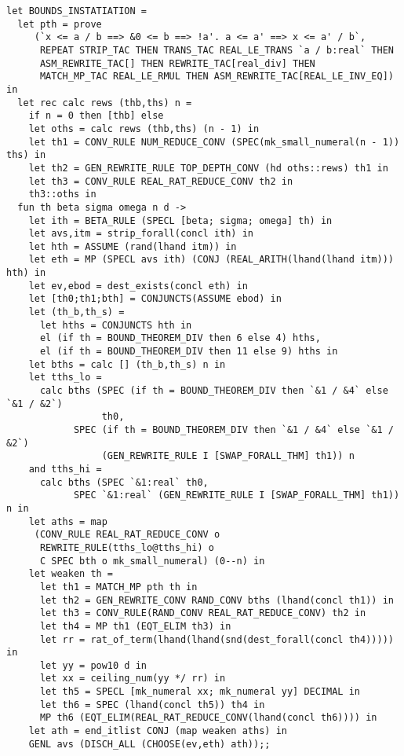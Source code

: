 \documentclass[10pt]{article}
\theoremstyle{definition}
\theoremstyle{remark}
\numberwithin{equation}{section}
\begin{document}
\begin{scriptsize}\begin{verbatim}
let BOUNDS_INSTATIATION =
  let pth = prove
     (`x <= a / b ==> &0 <= b ==> !a'. a <= a' ==> x <= a' / b`,
      REPEAT STRIP_TAC THEN TRANS_TAC REAL_LE_TRANS `a / b:real` THEN
      ASM_REWRITE_TAC[] THEN REWRITE_TAC[real_div] THEN
      MATCH_MP_TAC REAL_LE_RMUL THEN ASM_REWRITE_TAC[REAL_LE_INV_EQ]) in
  let rec calc rews (thb,ths) n =
    if n = 0 then [thb] else
    let oths = calc rews (thb,ths) (n - 1) in
    let th1 = CONV_RULE NUM_REDUCE_CONV (SPEC(mk_small_numeral(n - 1)) ths) in
    let th2 = GEN_REWRITE_RULE TOP_DEPTH_CONV (hd oths::rews) th1 in
    let th3 = CONV_RULE REAL_RAT_REDUCE_CONV th2 in
    th3::oths in
  fun th beta sigma omega n d ->
    let ith = BETA_RULE (SPECL [beta; sigma; omega] th) in
    let avs,itm = strip_forall(concl ith) in
    let hth = ASSUME (rand(lhand itm)) in
    let eth = MP (SPECL avs ith) (CONJ (REAL_ARITH(lhand(lhand itm))) hth) in
    let ev,ebod = dest_exists(concl eth) in
    let [th0;th1;bth] = CONJUNCTS(ASSUME ebod) in
    let (th_b,th_s) =
      let hths = CONJUNCTS hth in
      el (if th = BOUND_THEOREM_DIV then 6 else 4) hths,
      el (if th = BOUND_THEOREM_DIV then 11 else 9) hths in
    let bths = calc [] (th_b,th_s) n in
    let tths_lo =
      calc bths (SPEC (if th = BOUND_THEOREM_DIV then `&1 / &4` else `&1 / &2`)
                 th0,
            SPEC (if th = BOUND_THEOREM_DIV then `&1 / &4` else `&1 / &2`)
                 (GEN_REWRITE_RULE I [SWAP_FORALL_THM] th1)) n
    and tths_hi =
      calc bths (SPEC `&1:real` th0,
            SPEC `&1:real` (GEN_REWRITE_RULE I [SWAP_FORALL_THM] th1)) n in
    let aths = map
     (CONV_RULE REAL_RAT_REDUCE_CONV o
      REWRITE_RULE(tths_lo@tths_hi) o
      C SPEC bth o mk_small_numeral) (0--n) in
    let weaken th =
      let th1 = MATCH_MP pth th in
      let th2 = GEN_REWRITE_CONV RAND_CONV bths (lhand(concl th1)) in
      let th3 = CONV_RULE(RAND_CONV REAL_RAT_REDUCE_CONV) th2 in
      let th4 = MP th1 (EQT_ELIM th3) in
      let rr = rat_of_term(lhand(lhand(snd(dest_forall(concl th4))))) in
      let yy = pow10 d in
      let xx = ceiling_num(yy */ rr) in
      let th5 = SPECL [mk_numeral xx; mk_numeral yy] DECIMAL in
      let th6 = SPEC (lhand(concl th5)) th4 in
      MP th6 (EQT_ELIM(REAL_RAT_REDUCE_CONV(lhand(concl th6)))) in
    let ath = end_itlist CONJ (map weaken aths) in
    GENL avs (DISCH_ALL (CHOOSE(ev,eth) ath));;
\end{verbatim}\end{scriptsize}
\end{document}
